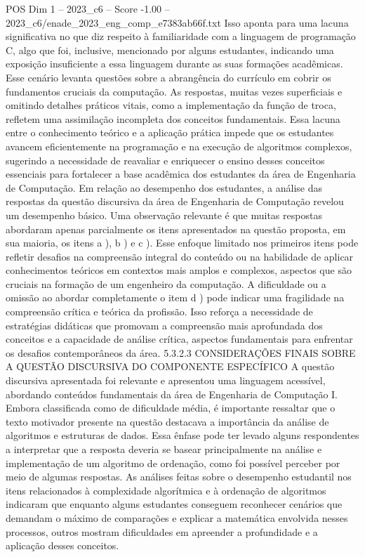 \begin{textsample}{POS Dim 1 – 2023\_c6 – Score -1.00 – 2023\_c6/enade\_2023\_eng\_comp\_e7383ab66f.txt}
Isso aponta para uma lacuna significativa no que diz respeito à familiaridade com a linguagem de programação C, algo que foi, inclusive, mencionado por alguns estudantes, indicando uma exposição insuficiente a essa linguagem durante as suas formações acadêmicas.
Esse cenário levanta questões sobre a abrangência do currículo em cobrir os fundamentos cruciais da computação.
As respostas, muitas vezes superficiais e omitindo detalhes práticos vitais, como a implementação da função de troca, refletem uma assimilação incompleta dos conceitos fundamentais.
Essa lacuna entre o conhecimento teórico e a aplicação prática impede que os estudantes avancem eficientemente na programação e na execução de algoritmos complexos, sugerindo a necessidade de reavaliar e enriquecer o ensino desses conceitos essenciais para fortalecer a base acadêmica dos estudantes da área de Engenharia de Computação.
Em relação ao desempenho dos estudantes, a análise das respostas da questão discursiva da área de Engenharia de Computação revelou um desempenho básico.
Uma observação relevante é que muitas respostas abordaram apenas parcialmente os itens apresentados na questão proposta, em sua maioria, os itens a ), b ) e c ).
Esse enfoque limitado nos primeiros itens pode refletir desafios na compreensão integral do conteúdo ou na habilidade de aplicar conhecimentos teóricos em contextos mais amplos e complexos, aspectos que são cruciais na formação de um engenheiro da computação.
A dificuldade ou a omissão ao abordar completamente o item d ) pode indicar uma fragilidade na compreensão crítica e teórica da profissão.
Isso reforça a necessidade de estratégias didáticas que promovam a compreensão mais aprofundada dos conceitos e a capacidade de análise crítica, aspectos fundamentais para enfrentar os desafios contemporâneos da área. 5.3.2.3 CONSIDERAÇÕES FINAIS SOBRE A QUESTÃO DISCURSIVA DO COMPONENTE ESPECÍFICO A questão discursiva apresentada foi relevante e apresentou uma linguagem acessível, abordando conteúdos fundamentais da área de Engenharia de Computação I.
Embora classificada como de dificuldade média, é importante ressaltar que o texto motivador presente na questão destacava a importância da análise de algoritmos e estruturas de dados.
Essa ênfase pode ter levado alguns respondentes a interpretar que a resposta deveria se basear principalmente na análise e implementação de um algoritmo de ordenação, como foi possível perceber por meio de algumas respostas.
As análises feitas sobre o desempenho estudantil nos itens relacionados à complexidade algorítmica e à ordenação de algoritmos indicaram que enquanto alguns estudantes conseguem reconhecer cenários que demandam o máximo de comparações e explicar a matemática envolvida nesses processos, outros mostram dificuldades em apreender a profundidade e a aplicação desses conceitos.

\end{textsample}
